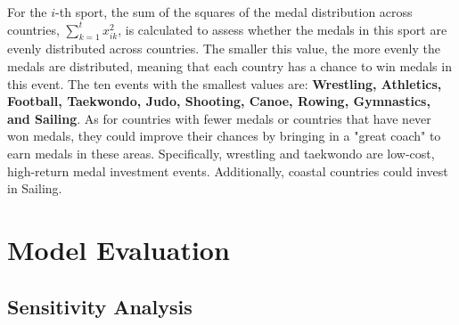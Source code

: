 \documentclass{mcmthesis}  %
\begin{document}
For the \( i \)-th sport, the sum of the squares of the medal distribution across countries, \( \sum_{k=1}^t x_{ik}^2 \), is calculated to assess whether the medals in this sport are evenly distributed across countries. The smaller this value, the more evenly the medals are distributed, meaning that each country has a chance to win medals in this event. The ten events with the smallest values are: \textbf{Wrestling, Athletics, Football, Taekwondo, Judo, Shooting, Canoe, Rowing, Gymnastics, and Sailing}. As for countries with fewer medals or countries that have never won medals, they could improve their chances by bringing in a "great coach" to earn medals in these areas. Specifically, wrestling and taekwondo are low-cost, high-return medal investment events. Additionally, coastal countries could invest in Sailing.

\section{Model Evaluation}
\subsection{Sensitivity Analysis}
\end{document}
